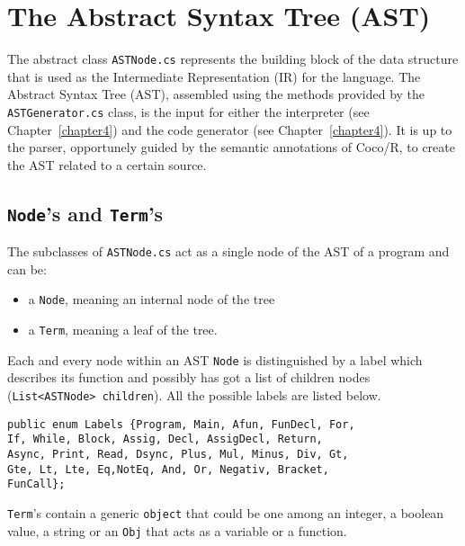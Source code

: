 \chapter{\label{chapter3} The Abstract Syntax Tree (AST)}

The abstract class \texttt{ASTNode.cs} represents the building block of the data structure that is used as the Intermediate Representation (IR) for the \fwap language. The Abstract Syntax Tree (AST), assembled using the methods provided by the \texttt{ASTGenerator.cs} class, is the input for either the interpreter (see Chapter~\ref{chapter4}) and the \fsharp code generator (see Chapter~\ref{chapter4}). It is up to the parser, opportunely guided by the semantic annotations of Coco/R, to create the AST related to a certain \fwap source.

\section{\texttt{Node}'s and \texttt{Term}'s}

The subclasses of \texttt{ASTNode.cs} act as a single node of the AST of a program and can be:
\begin{itemize}
	\item a \texttt{Node}, meaning an internal node of the tree 
	\item a \texttt{Term}, meaning a leaf of the tree.
\end{itemize}

Each and every node within an AST \texttt{Node} is distinguished by a label which describes its function and possibly has got a list of children nodes (\texttt{List<ASTNode> children}). All the possible labels are listed below.\\

\begin{lstlisting}[caption=Labels for \texttt{Node}'s.]
public enum Labels {Program, Main, Afun, FunDecl, For,
If, While, Block, Assig, Decl, AssigDecl, Return, 
Async, Print, Read, Dsync, Plus, Mul, Minus, Div, Gt,
Gte, Lt, Lte, Eq,NotEq, And, Or, Negativ, Bracket, 
FunCall};
\end{lstlisting}

\texttt{Term}'s contain a generic \texttt{object} that could be one among an integer, a boolean value, a string or an \texttt{Obj} that acts as a variable or a function.